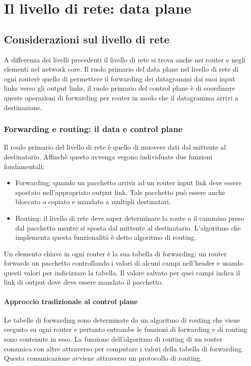 \chapter{Il livello di rete: data plane}
\section{Considerazioni sul livello di rete}
A differenza dei livelli precedenti il livello di rete si trova anche nei router e negli elementi nel network core. Il ruolo primario del data plane nel 
livello di rete di ogni router\`e quello di permettere il forwarding dei datagrammi dai suoi input links verso gli output links, il ruolo primario del 
control plane \`e di coordinare queste operazioni di forwarding per router in modo che il datagramma arrivi a destinazione. 
\subsection{Forwarding e routing: il data e control plane}
Il roulo primario del livello di rete \`e quello di muovere dati dal mittente al destinatario. Affinch\`e questo avvenga vegono individuate due funzioni
fondamentali:
\begin{itemize}
\item Forwarding: quando un pacchetto arriva ad un router input link deve essere spostato nell'appropriato output link. Tale pacchetto pu\`o essere anche 
bloccato o copiato e mandato a multipli destinatari.
\item Routing: il livello di rete deve saper determinare la route o il cammino preso dal pacchetto mentre si sposta dal mittente al destinatario. 
L'algoritmo che implementa questa funzionalit\`a \`e detto algoritmo di routing.
\end{itemize}
Un elemento chiave in ogni router \`e la sua tabella di forwarding: un router forwards un pacchetto controllando i valori di alcuni campi nell'header e 
usando questi valori per indicizzare la tabella. Il valore salvato per quei campi indica il link di output dove deve essere mandato il pacchetto. 
\subsubsection{Approccio tradizionale al control plane}
Le tabelle di forwarding sono determinate da un algoritmo di routing che viene eseguito su ogni router e pertanto entrambe le funzioni di forwarding e di
routing sono contenute in esso. La funzione dell'algoritmo di routing di un router comunica con altre attraverso per computare i valori della tabella di 
forwarding. Questa comunicazione avviene attraverso un protocollo di routing. 
